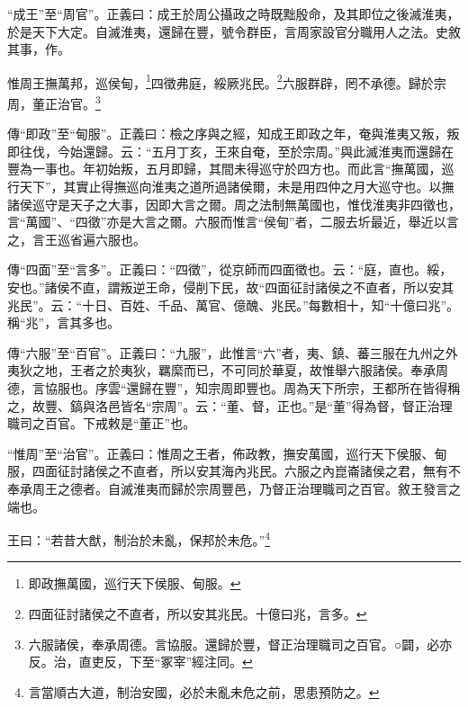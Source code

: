 {\noindent\shu{}\fzkt “成王”至“周官”。正義曰：成王於周公攝政之時既黜殷命，及其即位之後滅淮夷，於是天下大定。自滅淮夷，還歸在豐，號令群臣，言周家設官分職用人之法。史敘其事，作。 \par}

惟周王撫萬邦，巡侯甸，\footnote{即政撫萬國，巡行天下侯服、甸服。}四徵弗庭，綏厥兆民。\footnote{四面征討諸侯之不直者，所以安其兆民。十億曰兆，言多。}六服群辟，罔不承德。歸於宗周，董正治官。\footnote{六服諸侯，奉承周德。言協服。還歸於豐，督正治理職司之百官。○闢，必亦反。治，直吏反，下至“冢宰”經注同。}


{\noindent\zhuan{}\fzbyks 傳“即政”至“甸服”。正義曰：檢之序與之經，知成王即政之年，奄與淮夷又叛，叛即往伐，今始還歸。云：“五月丁亥，王來自奄，至於宗周。”與此滅淮夷而還歸在豐為一事也。年初始叛，五月即歸，其間未得巡守於四方也。而此言“撫萬國，巡行天下”，其實止得撫巡向淮夷之道所過諸侯爾，未是用四仲之月大巡守也。以撫諸侯巡守是天子之大事，因即大言之爾。周之法制無萬國也，惟伐淮夷非四徵也，言“萬國”、“四徵”亦是大言之爾。六服而惟言“侯甸”者，二服去圻最近，舉近以言之，言王巡省遍六服也。 \par}

{\noindent\zhuan{}\fzbyks 傳“四面”至“言多”。正義曰：“四徵”，從京師而四面徵也。云：“庭，直也。綏，安也。”諸侯不直，謂叛逆王命，侵削下民，故“四面征討諸侯之不直者，所以安其兆民”。云：“十日、百姓、千品、萬官、億醜、兆民。”每數相十，知“十億曰兆”。稱“兆”，言其多也。 \par}

{\noindent\zhuan{}\fzbyks 傳“六服”至“百官”。正義曰：“九服”，此惟言“六”者，夷、鎮、蕃三服在九州之外夷狄之地，王者之於夷狄，羈縻而已，不可同於華夏，故惟舉六服諸侯。奉承周德，言協服也。序雲“還歸在豐”，知宗周即豐也。周為天下所宗，王都所在皆得稱之，故豐、鎬與洛邑皆名“宗周”。云：“董、督，正也。”是“董”得為督，督正治理職司之百官。下戒敕是“董正”也。 \par}

{\noindent\shu{}\fzkt “惟周”至“治官”。正義曰：惟周之王者，佈政教，撫安萬國，巡行天下侯服、甸服，四面征討諸侯之不直者，所以安其海內兆民。六服之內崑崙諸侯之君，無有不奉承周王之德者。自滅淮夷而歸於宗周豐邑，乃督正治理職司之百官。敘王發言之端也。 \par}

王曰：“若昔大猷，制治於未亂，保邦於未危。”\footnote{言當順古大道，制治安國，必於未亂未危之前，思患預防之。}

